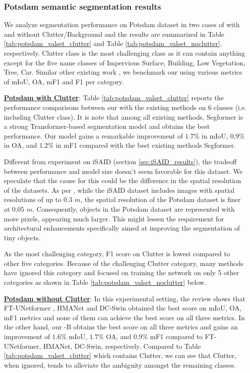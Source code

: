 \documentclass[journal]{IEEEtran}
\begin{document}
\subsubsection{\textbf{Potsdam semantic segmentation results}}
\label{sec:Potsdam_results}
We analyze segmentation performance on Potsdam dataset in two cases of with and without Clutter/Background and the results are summarized in Table \ref{tab:potsdam_valset_clutter} and Table \ref{tab:potsdam_valset_noclutter}, respectively. Clutter class is the most challenging class as it can contain anything except for the five name classes of Impervious Surface, Building, Low Vegetation, Tree, Car. Similar other existing work \cite{li2020scattnet, sun2022ringmo, wang2022unetformer}, we benchmark our \model using various metrics of mIoU, OA, mF1 and F1 per category. 


\noindent
\underline{\textbf{Potsdam with Clutter}}:
Table \ref{tab:potsdam_valset_clutter} reports the performance comparisons between our \model with the existing methods on 6 classes (i.e. including Clutter class). It is note that among all existing methods, Segformer \cite{xie2021segformer} is a strong Transformer-based segmentation model and obtains the best performance. Our model gains a remarkable improvement of $1.7\%$ in mIoU, $0.9\%$ in OA, and $1.2\%$ in mF1 compared with the best existing methods Segformer. 

Different from experiment on iSAID (section \ref{sec:iSAID_results}), the tradeoff between performance and model size doesn't seem favorable for this dataset. We speculate that the cause for this could be the difference in the spatial resolution of the datasets. As per \cite{long2021creating}, while the iSAID dataset includes images with spatial resolutions of up to $0.3$ $m$, the spatial resolution of the Potsdam dataset is finer at $0.05$ $m$. Consequently, objects in the Potsdam dataset are represented with more pixels, appearing much larger. This might lessen the requirement for architectural enhancements specifically aimed at improving the segmentation of tiny objects. 

As the most challenging category, F1 score on Clutter is lowest compared to other five categories. Because of the challenging Clutter category, many methods have ignored this category and focused on training the network on only 5 other categories as shown in Table \ref{tab:potsdam_valset_noclutter} below. 



\noindent
\underline{\textbf{Potsdam without Clutter}}:
In this experimental setting, the review shows that FT-UNetformer \cite{wang2022unetformer}, HMANet \cite{niu2021hybrid} and DC-Swin \cite{wang2022novel} obtained the best score on mIoU, OA, mF1 metrics and none of them can achieve the best score on all three metrics. In the other hand, our \model-B obtains the best score on all three metrics and gains an improvement of $1.6\%$ mIoU, $1.7\%$ OA, and $0.9\%$ mF1 compared to FT-UNetformer, HMANet, DC-Swin, respectively. Compared to Table \ref{tab:potsdam_valset_clutter} which contains Clutter, we can see that Clutter, when ignored, tends to alleviate the ambiguity amongst the remaining classes. 
\end{document}

